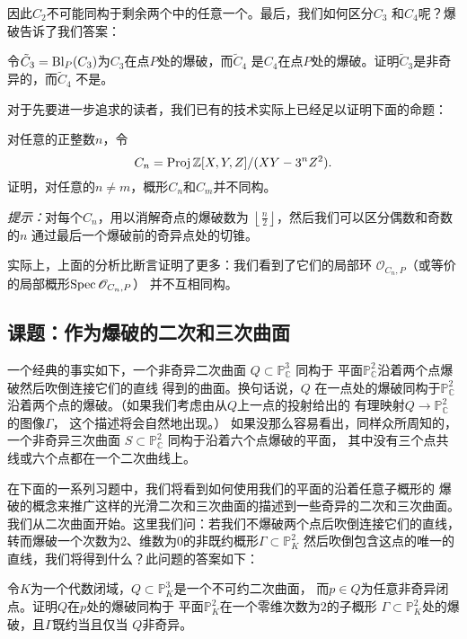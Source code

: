 因此$C_2$不可能同构于剩余两个中的任意一个。最后，我们如何区分$C_3$
和$C_4$呢？爆破告诉了我们答案：

\begin{exe}\label{exe:4.57}
	令$\tilde C_3=\operatorname{Bl}_P(C_3)$为$C_3$在点$P$处的爆破，而$\tilde C_4$
	是$C_4$在点$P$处的爆破。证明$\tilde C_3$是非奇异的，而$\tilde C_4$
	不是。
\end{exe}


对于先要进一步追求的读者，我们已有的技术实际上已经足以证明下面的命题：

\begin{exe}\label{exe:4.58}
对任意的正整数$n$，令
\[
	C_n=\operatorname{Proj} \mathbb{Z}[X,Y,Z]/(XY-3^nZ^2).
\]
证明，对任意的$n\neq m$，概形$C_n$和$C_m$并不同构。

\emph{提示：}对每个$C_n$，用以消解奇点的爆破数为
$\left\lfloor\frac{n}{2}\right\rfloor$，然后我们可以区分偶数和奇数的$n$
通过最后一个爆破前的奇异点处的切锥。
\end{exe}

实际上，上面的分析比断言证明了更多：我们看到了它们的局部环
$\mathscr O_{C_n,P}$（或等价的局部概形$\operatorname{Spec} \mathscr O_{C_n,P}$）
并不互相同构。


\subsection{课题：作为爆破的二次和三次曲面}\label{s:4.2.5}

一个经典的事实如下，一个非奇异二次曲面 
$Q \subset \mathbb{P}_{\mathbb{C}}^{3}$ 同构于 
平面$\mathbb{P}_{\mathbb{C}}^{2}$沿着两个点爆破然后吹倒连接它们的直线
得到的曲面。换句话说，$Q$ 在一点处的爆破同构于$\mathbb{P}_{\mathbb{C}}^{2}$ 
沿着两个点的爆破。（如果我们考虑由从$Q$上一点的投射给出的
有理映射$Q \rightarrow \mathbb{P}_{\mathbb{C}}^{2}$的图像$\Gamma$，
这个描述将会自然地出现。）
如果没那么容易看出，同样众所周知的，一个非奇异三次曲面
$S \subset \mathbb{P}_{\mathbb{C}}^{2}$ 同构于沿着六个点爆破的平面，
其中没有三个点共线或六个点都在一个二次曲线上。

在下面的一系列习题中，我们将看到如何使用我们的平面的沿着任意子概形的
爆破的概念来推广这样的光滑二次和三次曲面的描述到一些奇异的二次和三次曲面。
我们从二次曲面开始。这里我们问：若我们不爆破两个点后吹倒连接它们的直线，
转而爆破一个次数为$2$、维数为$0$的非既约概形$\Gamma \subset \mathbb{P}_{K}^{2}$
然后吹倒包含这点的唯一的直线，我们将得到什么？此问题的答案如下：

\begin{exe}\label{exe:4.59}
令$K$为一个代数闭域，$Q \subset \mathbb{P}_{K}^{3}$是一个不可约二次曲面，
而$p \in Q$为任意非奇异闭点。证明$Q$在$p$处的爆破同构于
平面$\mathbb{P}_{K}^{2}$在一个零维次数为$2$的子概形
$\Gamma \subset \mathbb{P}_{K}^{2}$处的爆破，且$\Gamma$既约当且仅当
$Q$非奇异。
\end{exe}

